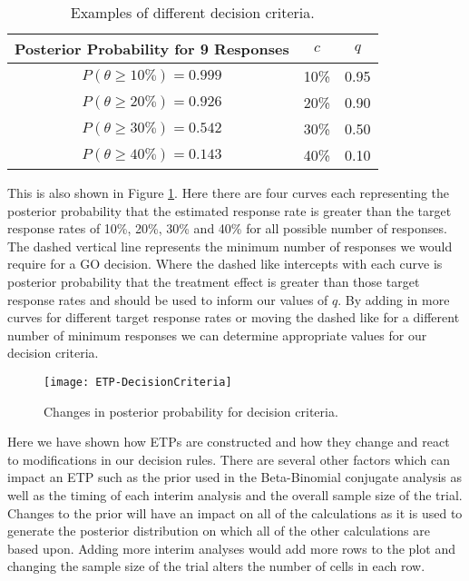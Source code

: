 \begin{table}[h!]
	\centering
	\caption{Examples of different decision criteria.}
	\label{tab_etp:DecisionCriteria}
	\begin{tabular}{c|c|c}
		\hline
		\textbf{Posterior Probability for 9 Responses}     & \textbf{$c$}  & \textbf{$q$}              \\ \hline
		$P(\theta  \geq 10\%) =  0.999$  & 10\% 	& 0.95                            					\\
		$P(\theta  \geq 20\%) =  0.926$  & 20\%     & 0.90                         \\
		$P(\theta  \geq 30\%) =  0.542$  & 30\%     & 0.50                      \\
		$P(\theta  \geq 40\%) =  0.143$  & 40\%     & 0.10                    \\ \hline
	\end{tabular}
\end{table}

This is also shown in Figure \ref{fig_etp:DecisionCriteria}.  Here there are four curves each representing the posterior probability that the estimated response rate is greater than the target response rates of 10\%, 20\%, 30\% and 40\% for all possible number of responses. The dashed vertical line represents the minimum number of responses we would require for a GO decision. Where the dashed like intercepts with each curve is posterior probability that the treatment effect is greater than those target response rates and should be used to inform our values of $q$. By adding in more curves for different target response rates or moving the dashed like for a different number of minimum responses we can determine appropriate values for our decision criteria. 

\begin{figure}[h!]
	\centering
	\caption{Changes in posterior probability for decision criteria.}
	\label{fig_etp:DecisionCriteria}
	\texttt{[image: ETP-DecisionCriteria]}
\end{figure}

Here we have shown how ETPs are constructed and how they change and react to modifications in our decision rules. There are several other factors which can impact an ETP such as the prior used in the Beta-Binomial conjugate analysis as well as the timing of each interim analysis and the overall sample size of the trial. Changes to the prior will have an impact on all of the calculations as it is used to generate the posterior distribution on which all of the other calculations are based upon. Adding more interim analyses would add more rows to the plot and changing the sample size of the trial alters the number of cells in each row. 

